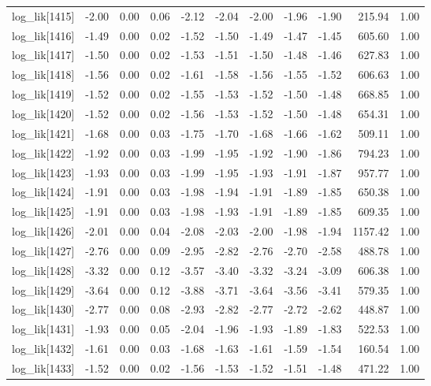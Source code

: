 \begin{table}[ht]
\begin{tabular}{rrrrrrrrrrr}
  log\_lik[1415] & -2.00 & 0.00 & 0.06 & -2.12 & -2.04 & -2.00 & -1.96 & -1.90 & 215.94 & 1.00 \\ 
  log\_lik[1416] & -1.49 & 0.00 & 0.02 & -1.52 & -1.50 & -1.49 & -1.47 & -1.45 & 605.60 & 1.00 \\ 
  log\_lik[1417] & -1.50 & 0.00 & 0.02 & -1.53 & -1.51 & -1.50 & -1.48 & -1.46 & 627.83 & 1.00 \\ 
  log\_lik[1418] & -1.56 & 0.00 & 0.02 & -1.61 & -1.58 & -1.56 & -1.55 & -1.52 & 606.63 & 1.00 \\ 
  log\_lik[1419] & -1.52 & 0.00 & 0.02 & -1.55 & -1.53 & -1.52 & -1.50 & -1.48 & 668.85 & 1.00 \\ 
  log\_lik[1420] & -1.52 & 0.00 & 0.02 & -1.56 & -1.53 & -1.52 & -1.50 & -1.48 & 654.31 & 1.00 \\ 
  log\_lik[1421] & -1.68 & 0.00 & 0.03 & -1.75 & -1.70 & -1.68 & -1.66 & -1.62 & 509.11 & 1.00 \\ 
  log\_lik[1422] & -1.92 & 0.00 & 0.03 & -1.99 & -1.95 & -1.92 & -1.90 & -1.86 & 794.23 & 1.00 \\ 
  log\_lik[1423] & -1.93 & 0.00 & 0.03 & -1.99 & -1.95 & -1.93 & -1.91 & -1.87 & 957.77 & 1.00 \\ 
  log\_lik[1424] & -1.91 & 0.00 & 0.03 & -1.98 & -1.94 & -1.91 & -1.89 & -1.85 & 650.38 & 1.00 \\ 
  log\_lik[1425] & -1.91 & 0.00 & 0.03 & -1.98 & -1.93 & -1.91 & -1.89 & -1.85 & 609.35 & 1.00 \\ 
  log\_lik[1426] & -2.01 & 0.00 & 0.04 & -2.08 & -2.03 & -2.00 & -1.98 & -1.94 & 1157.42 & 1.00 \\ 
  log\_lik[1427] & -2.76 & 0.00 & 0.09 & -2.95 & -2.82 & -2.76 & -2.70 & -2.58 & 488.78 & 1.00 \\ 
  log\_lik[1428] & -3.32 & 0.00 & 0.12 & -3.57 & -3.40 & -3.32 & -3.24 & -3.09 & 606.38 & 1.00 \\ 
  log\_lik[1429] & -3.64 & 0.00 & 0.12 & -3.88 & -3.71 & -3.64 & -3.56 & -3.41 & 579.35 & 1.00 \\ 
  log\_lik[1430] & -2.77 & 0.00 & 0.08 & -2.93 & -2.82 & -2.77 & -2.72 & -2.62 & 448.87 & 1.00 \\ 
  log\_lik[1431] & -1.93 & 0.00 & 0.05 & -2.04 & -1.96 & -1.93 & -1.89 & -1.83 & 522.53 & 1.00 \\ 
  log\_lik[1432] & -1.61 & 0.00 & 0.03 & -1.68 & -1.63 & -1.61 & -1.59 & -1.54 & 160.54 & 1.00 \\ 
  log\_lik[1433] & -1.52 & 0.00 & 0.02 & -1.56 & -1.53 & -1.52 & -1.51 & -1.48 & 471.22 & 1.00 \\ 

\end{tabular}
\end{table}
